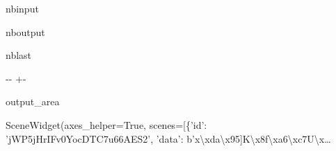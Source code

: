 \documentclass[letterpaper,10pt,english]{sphinxmanual}
\begin{document}
\begin{sphinxuseclass}{nbinput}
{
\begin{sphinxVerbatim}[commandchars=\\\{\}]
\llap{\color{nbsphinxin}[14]:\,\hspace{\fboxrule}\hspace{\fboxsep}}
 
              
             
              
\end{sphinxVerbatim}
}

\end{sphinxuseclass}
\begin{sphinxuseclass}{nboutput}
\begin{sphinxuseclass}{nblast}
{

\kern-\sphinxverbatimsmallskipamount\kern-\baselineskip
\kern+\FrameHeightAdjust\kern-\fboxrule
\vspace{\nbsphinxcodecellspacing}

\begin{sphinxuseclass}{output_area}
\begin{sphinxuseclass}{}


\begin{sphinxVerbatim}[commandchars=\\\{\}]
\llap{\color{nbsphinxout}[14]:\,\hspace{\fboxrule}\hspace{\fboxsep}}SceneWidget(axes\_helper=True, scenes=[\{'id': 'jWP5jHrIFv0YocDTC7u66AES2', 'data': b'x\textbackslash{}xda\textbackslash{}x95]K\textbackslash{}x8f\textbackslash{}xa6\textbackslash{}xc7U\textbackslash{}x…
\end{sphinxVerbatim}



\end{sphinxuseclass}
\end{sphinxuseclass}
}

\end{sphinxuseclass}
\end{sphinxuseclass}
\sphinxstepscope
\end{document}
